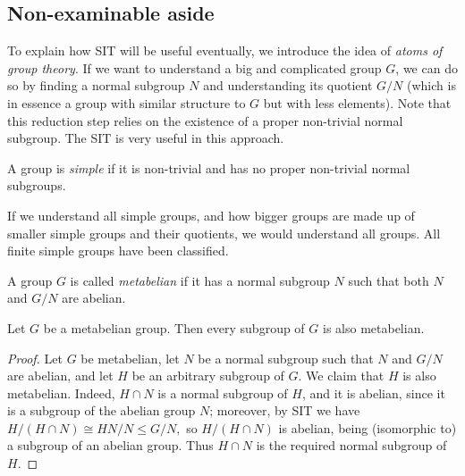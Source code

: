 \subsection{Non-examinable aside}
To explain how SIT will be useful eventually, we introduce the idea of \emph{atoms of group theory}. If we want to understand a big and complicated group $G$, we can do so by finding a normal subgroup $N$ and understanding its quotient $G/N$ (which is in essence a group with similar structure
to $G$ but with less elements). Note that this reduction step relies on the existence of a proper non-trivial normal subgroup. The SIT is very useful in this approach.
\begin{definition}
  A group is \emph{simple} if it is non-trivial and has no proper non-trivial normal
  subgroups.
\end{definition}

If we understand all simple groups, and how bigger groups are made up of smaller simple groups and their quotients, we would understand all groups. All finite simple groups have
been classified. 

\begin{definition}
    A group $G$ is called \emph{metabelian} if it has a normal subgroup $N$ such that both $N$ and $G/N$ are abelian.
\end{definition}
\begin{theorem}
  Let $G$ be a metabelian group. Then every subgroup of $G$ is also metabelian.
  \label{<+label+>}
\end{theorem}

\begin{proof}
   Let $G$ be metabelian, let $N$ be a normal subgroup such that $N$ and $G/N$ are abelian, and let $H$ be an arbitrary subgroup of $G$. We claim that $H$ is also metabelian. Indeed, $H \cap N$ is a normal subgroup of $H$, and it is abelian, since it is a subgroup of the abelian group $N$; moreover, by SIT we have $H/(H \cap N) \cong HN/N \leq G/N,$ so $H/(H \cap N)$ is abelian, being (isomorphic to) a subgroup of an abelian group. Thus $H \cap N$ is the required normal subgroup of $H$.
\end{proof}
